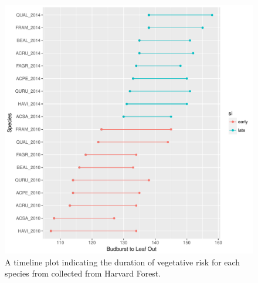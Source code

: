 \documentclass{article}\usepackage[]{graphicx}\usepackage[]{color}
\makeatletter
\def\maxwidth{ %
  \ifdim\Gin@nat@width>\linewidth
    \linewidth
  \else
    \Gin@nat@width
  \fi
}
\makeatother
\begin{document}
\begin{figure}[H]
\includegraphics[width=\maxwidth]{figure/forest-1} \caption[A timeline plot indicating the duration of vegetative risk for each species from collected from Harvard Forest]{A timeline plot indicating the duration of vegetative risk for each species from collected from Harvard Forest.}\label{fig:forest}
\end{figure}




\newpage

\end{document}
